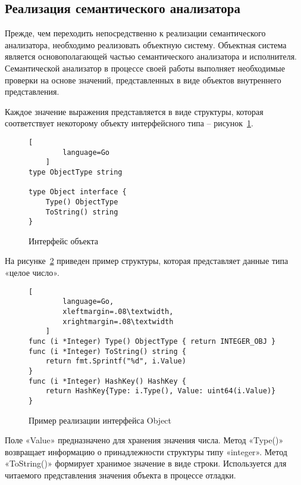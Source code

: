 \subsection{Реализация семантического анализатора}

Прежде, чем переходить непосредственно к реализации семантического анализатора, необходимо реализовать объектную систему.
Объектная система является основополагающей частью семантического анализатора и исполнителя.
Семантической анализатор в процессе своей работы выполняет необходимые проверки на основе значений,
представленных в виде объектов внутреннего представления.

Каждое значение выражения представляется в виде структуры, которая соответствует некоторому объекту интерфейсного типа -- рисунок~\ref{f:code_ObjectInterface}.

\begin{figure}[ht]
	\centering
	\vspace{\toppaddingoffigure}
	\begin{lstlisting}[
        language=Go
    ]
type ObjectType string

type Object interface {
    Type() ObjectType
    ToString() string
}
\end{lstlisting}
	\caption{Интерфейс объекта}
	\label{f:code_ObjectInterface}
\end{figure}

На рисунке~\ref{f:code_IObjectExample} приведен пример структуры, которая представляет данные типа «целое число».

\begin{figure}[ht]
	\centering
	\vspace{\toppaddingoffigure}
	\begin{lstlisting}[
        language=Go,
        xleftmargin=.08\textwidth,
        xrightmargin=.08\textwidth
    ]
func (i *Integer) Type() ObjectType { return INTEGER_OBJ }
func (i *Integer) ToString() string {
    return fmt.Sprintf("%d", i.Value)
}
func (i *Integer) HashKey() HashKey {
    return HashKey{Type: i.Type(), Value: uint64(i.Value)}
}
\end{lstlisting}
	\caption{Пример реализации интерфейса Object}
	\label{f:code_IObjectExample}
\end{figure}

Поле «Value» предназначено для хранения значения числа.
Метод «Type()» возвращает информацию о принадлежности структуры типу «integer». 
Метод «ToString()» формирует хранимое значение в виде строки.
Используется для читаемого представления значения объекта в процессе отладки. 

